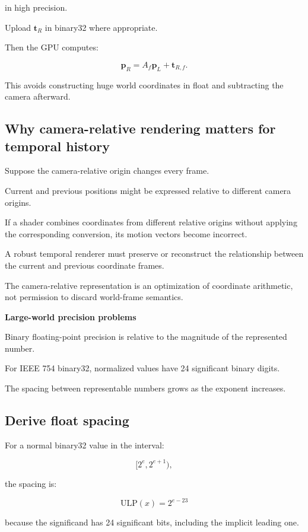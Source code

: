 in high precision.

Upload \(\mathbf t_R\) in binary32 where appropriate.

Then the GPU computes:

\[
 \boxed{ \mathbf p_R=A_f\mathbf p_L+\mathbf t_{R,f} }.
\]

This avoids constructing huge world coordinates in float and subtracting the camera afterward.

\subsection{Why camera-relative rendering matters for temporal history}\label{02-foundations-ii-ch036-why-camera-relative-rendering-matters-for-temporal-history}

Suppose the camera-relative origin changes every frame.

Current and previous positions might be expressed relative to different camera origins.

If a shader combines coordinates from different relative origins without applying the corresponding conversion, its motion vectors become incorrect.

A robust temporal renderer must preserve or reconstruct the relationship between the current and previous coordinate frames.

The camera-relative representation is an optimization of coordinate arithmetic, not permission to discard world-frame semantics.

\textbf{Large-world precision problems}

Binary floating-point precision is relative to the magnitude of the represented number.

For IEEE 754 binary32, normalized values have 24 significant binary digits.

The spacing between representable numbers grows as the exponent increases.

\subsection{Derive float spacing}\label{02-foundations-ii-ch036-derive-float-spacing}

For a normal binary32 value in the interval:

\[
 [2^e,2^{e+1}),
\]

the spacing is:

\[
 \boxed{ \mathrm{ULP}(x)=2^{e-23} }
\]

because the significand has 24 significant bits, including the implicit leading one.

